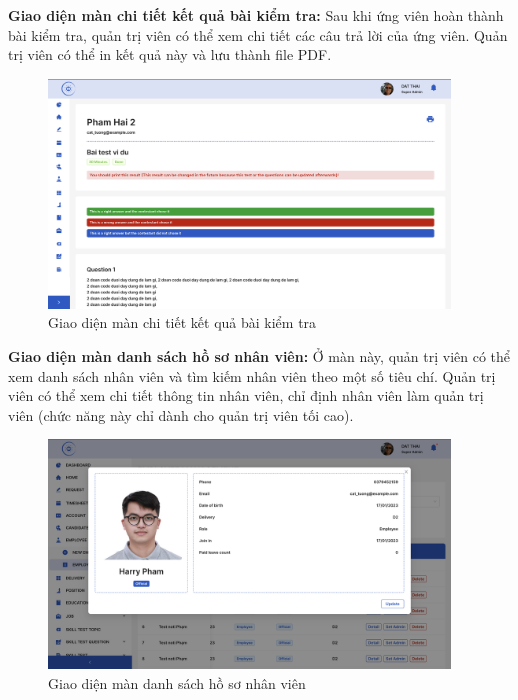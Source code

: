 \documentclass[../DoAn.tex]{subfiles}
\begin{document}
\textbf{Giao diện màn chi tiết kết quả bài kiểm tra:}
Sau khi ứng viên hoàn thành bài kiểm tra, quản trị viên có thể xem chi tiết các câu trả lời của ứng viên. Quản trị viên có thể in kết quả này và lưu thành file PDF.
\begin{figure}[H]
    \centering
    \includegraphics[width=0.95\textwidth]{Hinhve/ChiTietBaiKiemTraKyNang.png}
    \caption{Giao diện màn chi tiết kết quả bài kiểm tra}
\end{figure}

\textbf{Giao diện màn danh sách hồ sơ nhân viên:}
Ở màn này, quản trị viên có thể xem danh sách nhân viên và tìm kiếm nhân viên theo một số tiêu chí. Quản trị viên có thể xem chi tiết thông tin nhân viên, chỉ định nhân viên làm quản trị viên (chức năng này chỉ dành cho quản trị viên tối cao). 
\begin{figure}[H]
    \centering
    \includegraphics[width=0.95\textwidth]{Hinhve/QuanLyHoSoNhanVien.png}
    \caption{Giao diện màn danh sách hồ sơ nhân viên}
\end{figure}
\end{document}
